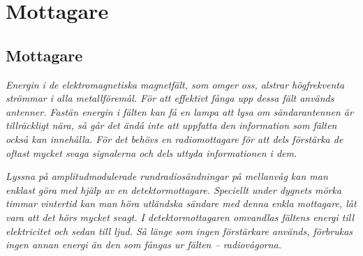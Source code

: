 \chapter{Mottagare}

\section{Mottagare}
\label{mottagare}

\emph{Energin i de elektromagnetiska magnetfält, som omger oss,
  alstrar högfrekventa strömmar i alla metallföremål.
  För att effektivt fånga upp dessa fält används antenner.
  Fastän energin i fälten kan få en lampa att lysa om sändarantennen
  är tillräckligt nära, så går det ändå inte att uppfatta den information
  som fälten också kan innehålla.
  För det behövs en radiomottagare för att dels förstärka de oftast mycket
  svaga signalerna och dels uttyda informationen i dem.}

\emph{Lyssna på amplitudmodulerade rundradiosändningar på mellanvåg
  kan man enklast göra med hjälp av en detektormottagare.
  Speciellt under dygnets mörka timmar vintertid kan man höra utländska sändare
  med denna enkla mottagare, låt vara att det hörs mycket svagt.
  I detektormottagaren omvandlas fältens energi till elektricitet och
  sedan till ljud.
  Så länge som ingen förstärkare används, förbrukas ingen annan energi än
  den som fångas ur fälten -- radiovågorna.}
